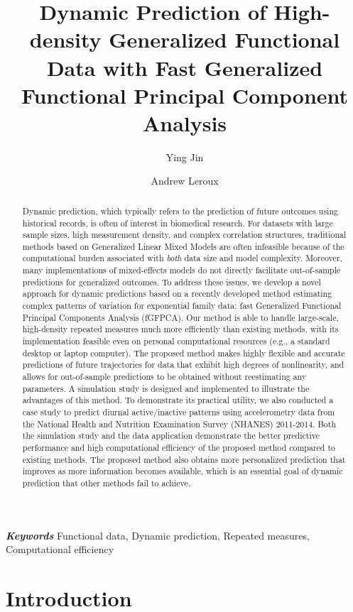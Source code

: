 \documentclass[12pt]{article}
\title{Dynamic Prediction of High-density Generalized Functional Data with Fast Generalized
Functional Principal Component Analysis}
\author[1,*]{Ying Jin}
\author[1]{Andrew Leroux}
\affil[1]{Department of Biostatistics and Informatics, University of Colorado Anschutz Medical Campus, Aurora, CO, USA}
\affil[*]{Corresponding author: Ying Jin, ying.jin@cuanschutz.edu}
\date{}
\providecommand{\keywords}[1]{\textbf{\textit{Keywords }} #1}
\begin{document}
\maketitle



\begin{abstract}
Dynamic prediction, which typically refers to the prediction of future outcomes using historical records, is often of interest in biomedical research. For datasets with large sample sizes, high measurement density, and complex correlation structures, traditional methods based on Generalized Linear Mixed Models are often infeasible because of the computational burden associated with \textit{both} data size and model complexity. Moreover, many implementations of mixed-effects models do not directly facilitate out-of-sample predictions for generalized outcomes. To address these issues, we develop a novel approach for dynamic predictions based on a recently developed method estimating complex patterns of variation for exponential family data: fast Generalized Functional Principal Components Analysis (fGFPCA). Our method is able to handle large-scale, high-density repeated measures much more efficiently than existing methods, with its implementation feasible even on personal computational resources (e.g., a standard desktop or laptop computer). The proposed method makes highly flexible and accurate predictions of future trajectories for data that exhibit high degrees of nonlinearity, and allows for out-of-sample predictions to be obtained without reestimating any parameters. A simulation study is designed and implemented to illustrate the advantages of this method. To demonstrate its practical utility, we also conducted a case study to predict diurnal active/inactive patterns using accelerometry data from the National Health and Nutrition Examination Survey (NHANES) 2011-2014. Both the simulation study and the data application demonstrate the better predictive performance and high computational efficiency of the proposed method compared to existing methods. The proposed method also obtains more personalized prediction that improves as more information becomes available, which is an essential goal of dynamic prediction that other methods fail to achieve. 
\end{abstract}

\keywords{Functional data, Dynamic prediction, Repeated measures, Computational efficiency}


\section{Introduction}
\label{sec:introduction}
\end{document}
